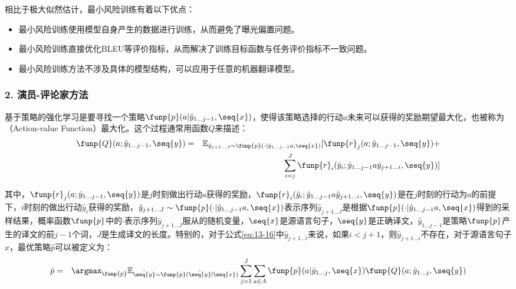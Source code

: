 \parinterval 相比于极大似然估计，最小风险训练有着以下优点：

\begin{itemize}
\vspace{0.5em}
\item 最小风险训练使用模型自身产生的数据进行训练，从而避免了曝光偏置问题。
\vspace{0.5em}
\item 最小风险训练直接优化BLEU等评价指标，从而解决了训练目标函数与任务评价指标不一致问题。
\vspace{0.5em}
\item 最小风险训练方法不涉及具体的模型结构，可以应用于任意的机器翻译模型。
\vspace{0.5em}
\end{itemize}


\subsubsection{2. 演员-评论家方法}

\parinterval 基于策略的强化学习是要寻找一个策略$\funp{p}(a|\hat{{y}}_{1 \ldots j-1},\seq{x})$，使得该策略选择的行动$a$未来可以获得的奖励期望最大化，也被称为{\small{}}（Action-value Function）最大化。这个过程通常用函数$Q$来描述：
\begin{eqnarray}
\funp{Q}(a;\hat{y}_{1 \ldots j-1},\seq{y}) & = & \mathbb{E}_{\hat{y}_{j+1 \ldots J} \sim \funp{p}(\cdot|\hat{y}_{1 \ldots j-1} a,\seq{x})}[\funp{r}_j(a;\hat{y}_{1 \ldots j-1},\seq{y}) + \nonumber \\
&  & \sum_{i=j}^J\funp{r}_i(\hat{{y}}_i;\hat{{y}}_{1 \ldots j-1}a\hat{{y}}_{j+1 \ldots i},\seq{y})]
\label{eq:13-16}
\end{eqnarray}

\noindent 其中，$\funp{r}_j(a;\hat{{y}}_{1 \ldots j-1},\seq{y})$是$j$时刻做出行动$a$获得的奖励，$\funp{r}_i(\hat{{y}}_i;\hat{{y}}_{1 \ldots j-1}a\hat{{y}}_{j+1 \ldots i},\seq{y})$是在$j$时刻的行动为$a$的前提下，$i$时刻的做出行动$\hat{{y}}_i$获得的奖励，$\hat{y}_{j+1 \ldots J} \sim \funp{p}(\cdot|\hat{y}_{1 \ldots j-1} a,\seq{x})$表示序列$\hat{y}_{j+1 \ldots J}$是根据$\funp{p}(\cdot|\hat{y}_{1 \ldots j-1} a,\seq{x})$得到的采样结果，概率函数$\funp{p}$中的$\cdot$表示序列$\hat{y}_{j+1 \ldots J}$服从的随机变量，$\seq{x}$是源语言句子，$\seq{y}$是正确译文，$\hat{{y}}_{1 \ldots j-1}$是策略$\funp{p}$产生的译文的前$j-1$个词，$J$是生成译文的长度。特别的，对于公式\ref{eq:13-16}中$\hat{{y}}_{j+1 \ldots i}$来说，如果$i<j+1$，则$\hat{{y}}_{j+1 \ldots i}$不存在，对于源语言句子$x$，最优策略$\hat{p}$可以被定义为：
\begin{eqnarray}
\hat{p} & = & \argmax_{\funp{p}}\mathbb{E}_{\hat{\seq{y}} \sim \funp{p}(\hat{\seq{y}} | \seq{x})}\sum_{j=1}^J\sum_{a \in A}\funp{p}(a|\hat{{y}}_{1 \ldots j},\seq{x})\funp{Q}(a;\hat{{y}}_{1 \ldots j},\seq{y})
\label{eq:13-17}
\end{eqnarray}

